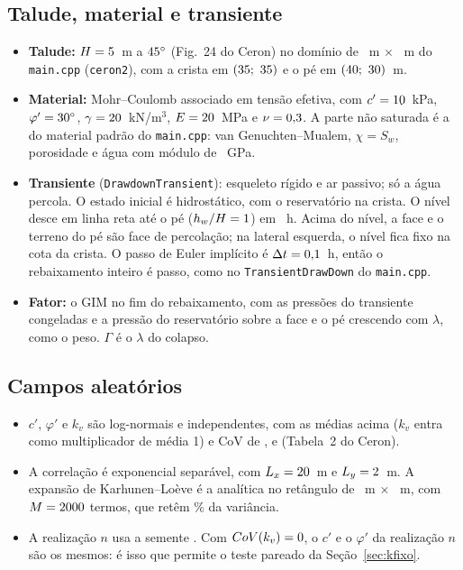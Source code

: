 \documentclass[11pt,a4paper]{article}
\begin{document}
\subsection{Talude, material e transiente}
\begin{itemize}
\item \textbf{Talude:} $H = 5$~m a $45^\circ$ (Fig.~24 do Ceron) no domínio de \DomX~m $\times$
\DomY~m do \texttt{main.cpp} (\texttt{ceron2}), com a crista em $(35;\ 35)$ e o pé em $(40;\ 30)$~m.
\item \textbf{Material:} Mohr--Coulomb associado em tensão efetiva, com $c' = 10$~kPa, $\varphi' = 30^\circ$,
$\gamma = 20$~kN/m$^3$, $E = 20$~MPa e $\nu = 0{,}3$. A parte não saturada é a do material padrão do
\texttt{main.cpp}: van Genuchten--Mualem, $\chi = S_w$, porosidade \Porosidade{} e água com módulo de \ModuloAgua~GPa.
\item \textbf{Transiente} (\texttt{DrawdownTransient}): esqueleto rígido e ar passivo; só a água percola. O estado
inicial é hidrostático, com o reservatório na crista. O nível desce em linha reta até o pé ($h_w/H = 1$) em
\Trebaix~h. Acima do nível, a face e o terreno do pé são face de percolação; na lateral esquerda, o nível fica
fixo na cota da crista. O passo de Euler implícito é
$\Delta t = 0{,}1$~h, então o rebaixamento inteiro é \PassosTrans{} passo, como no \texttt{TransientDrawDown} do
\texttt{main.cpp}.
\item \textbf{Fator:} o GIM no fim do rebaixamento, com as pressões do transiente congeladas e a pressão do reservatório
sobre a face e o pé crescendo com $\lambda$, como o peso. $\Gamma$ é o $\lambda$ do colapso.
\end{itemize}

\subsection{Campos aleatórios}
\begin{itemize}
\item $c'$, $\varphi'$ e $k_v$ são log-normais e independentes, com as médias acima ($k_v$ entra como multiplicador de
média 1) e CoV de \CovC, \CovPhi{} e \CovK{} (Tabela~2 do Ceron).
\item A correlação é exponencial separável, com $L_x = 20$~m e $L_y = 2$~m. A expansão de Karhunen--Loève é a
analítica no retângulo de \DomX~m $\times$ \DomY~m, com $M = 2000$ termos, que retêm \KLvar\% da variância.
\item A realização $n$ usa a semente \Semente. Com $CoV(k_v) = 0$, o $c'$ e o $\varphi'$ da realização $n$ são os
mesmos: é isso que permite o teste pareado da Seção~\ref{sec:kfixo}.
\end{itemize}
\end{document}
